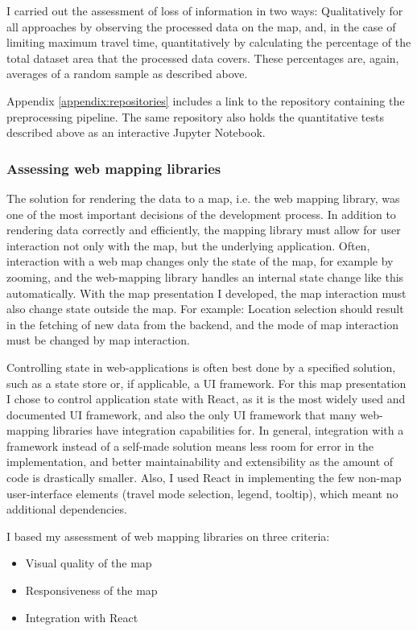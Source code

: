 I carried out the assessment of loss of information in two ways:
Qualitatively for all approaches by observing the processed data on the map,
and, in the case of limiting maximum travel time,
quantitatively by calculating the percentage of the total dataset area
that the processed data covers.
These percentages are, again, averages of a random sample as described above.

Appendix \ref{appendix:repositories} includes a link to the repository
containing the preprocessing pipeline.
The same repository also holds the quantitative tests described above
as an interactive Jupyter Notebook.

\subsubsection{Assessing web mapping libraries}

The solution for rendering the data to a map, i.e. the web mapping library,
was one of the most important decisions of the development process. 
In addition to rendering data correctly and efficiently,
the mapping library must allow for user interaction not only with the map,
but the underlying application.
Often, interaction with a web map changes only the state of the map,
for example by zooming,
and the web-mapping library handles an internal state change like this automatically.
With the map presentation I developed,
the map interaction must also change state outside the map.
For example:
Location selection should result in the fetching of new data from the backend,
and the mode of map interaction must be changed by map interaction.

Controlling state in web-applications is often best done by a specified solution,
such as a state store or, if applicable, a UI framework.
For this map presentation I chose to control application state with React,
as it is the most widely used and documented UI framework,
and also the only UI framework that many web-mapping libraries have integration capabilities for.
In general, integration with a framework instead of a self-made solution
means less room for error in the implementation,
and better maintainability and extensibility as the amount of code is drastically smaller.
Also, I used React in implementing the few non-map user-interface elements
(travel mode selection, legend, tooltip),
which meant no additional dependencies.

I based my assessment of web mapping libraries on three criteria:
\begin{itemize}
	\item Visual quality of the map
	\item Responsiveness of the map
	\item Integration with React
\end{itemize}

